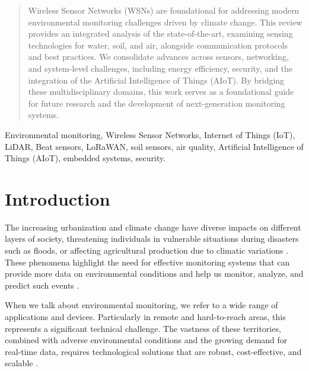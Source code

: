 \documentclass[conference]{IEEEtran}
\begin{document}
\begin{abstract}
Wireless Sensor Networks (WSNs) are foundational for addressing modern environmental monitoring challenges driven by climate change. This review provides an integrated analysis of the state-of-the-art, examining sensing technologies for water, soil, and air, alongside communication protocols and best practices. We consolidate advances across sensors, networking, and system-level challenges, including energy efficiency, security, and the integration of the Artificial Intelligence of Things (AIoT). By bridging these multidisciplinary domains, this work serves as a foundational guide for future research and the development of next-generation monitoring systems.
\end{abstract}

\begin{IEEEkeywords}
Environmental monitoring, Wireless Sensor Networks, Internet of Things (IoT), LiDAR, Beat sensors, LoRaWAN, soil sensors, air quality, Artificial Intelligence of Things (AIoT), embedded systems, security.
\end{IEEEkeywords}

\section{Introduction}
The increasing urbanization and climate change have diverse impacts on different layers of society, threatening individuals in vulnerable situations during disasters such as floods, or affecting agricultural production due to climatic variations \cite{jonkman_2005_global, hall_2014_understanding}. These phenomena highlight the need for effective monitoring systems that can provide more data on environmental conditions and help us monitor, analyze, and predict such events \cite{hall_2014_understanding}.

When we talk about environmental monitoring, we refer to a wide range of applications and devices. Particularly in remote and hard-to-reach areas, this represents a significant technical challenge. The vastness of these territories, combined with adverse environmental conditions and the growing demand for real-time data, requires technological solutions that are robust, cost-effective, and scalable \cite{chen_2013_natural, yellampalli_2021_wireless }.
\end{document}
